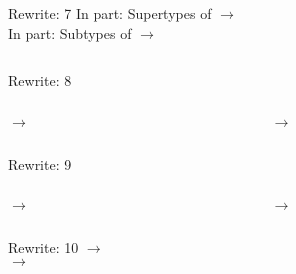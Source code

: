 \begin{frame}{Rewrite: 7}
  In  part: \colorbox{pink!30}{Supertypes of  $\to$ }\\
  In  part: \colorbox{pink!30}{Subtypes of  $\to$ }

  \begin{columns}
    \begin{column}{0.5\textwidth}
      \usebox\typecaseGbox
    \end{column}
    \begin{column}{0.5\textwidth}  %
      \usebox\typecaseHhbox
    \end{column}    
  \end{columns}
\end{frame}


\begin{frame}{Rewrite: 8}

  \begin{columns}
    \begin{column}{0.5\textwidth}
      \colorbox{pink!30}{ $\to$ }
      \usebox\typecaseHbox
    \end{column}
    \begin{column}{0.5\textwidth}  %
      \colorbox{pink!30}{ $\to$ }
      \usebox\typecaseIhbox
    \end{column}    
  \end{columns}
\end{frame}

\begin{frame}{Rewrite: 9}

  \begin{columns}
    \begin{column}{0.5\textwidth}
      \colorbox{pink!30}{ $\to$ }
      \usebox\typecaseIbox
    \end{column}
    \begin{column}{0.5\textwidth}  %
      \colorbox{pink!30}{ $\to$ }
      \usebox\typecaseJhbox
    \end{column}    
  \end{columns}
\end{frame}

\begin{frame}{Rewrite: 10}
  \colorbox{pink!30}{ $\to$ }\\
  \colorbox{pink!30}{ $\to$ }

  \begin{columns}
    \begin{column}{0.5\textwidth}
      \usebox\typecaseJbox
    \end{column}
    \begin{column}{0.5\textwidth}  %
      \usebox\typecaseKhbox
    \end{column}
  \end{columns}
\end{frame}


